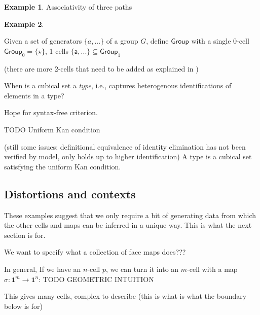 \documentclass[11pt]{article}
\theoremstyle{definition}
\newtheorem{example}{Example}
\newcommand{\pint}[1]{\mathbf{1}^{#1}}
\newcommand{\smap}[1]{s_{{#1}}}
\newcommand{\dmap}[2]{d_{({#1} , {#2})}}
\newcommand{\cset}[1]{\mathsf{{#1}}}
\begin{document}
\begin{example}{\label{exp:assoc}}
  Associativity of three paths
\end{example}

\begin{example}\label{exp:group}

  Given a set of generators $\{a, ...\}$ of a group $G$, define $\cset{Group}$
  with a single 0-cell $\cset{Group}_0 = \{ \cset{\star} \}$, 
  1-cells $\{\cset{a} , ... \} \subseteq \cset{Group}_1$ 
  
  (there are more 2-cells that need to be added as explained in \cite[Sect. 6.3]{bezem14_model_type_theor_cubic_sets})
\end{example}


When is a cubical set a \emph{type}, i.e., captures heterogenous identifications
of elements in a type?

Hope for syntax-free criterion.

TODO Uniform Kan condition


(still some issues: definitional equivalence of identity elimination has not
been verified by model, only holds up to higher identification)
A type is a cubical set satisfying the uniform Kan condition.

\subsection{Distortions and contexts} %

These examples suggest that we only require a bit of generating data from which
the other cells and maps can be inferred in a unique way. This is what the next
section is for.

We want to specify what a collection of face maps does???

In general, 
If we have an $n$-cell $p$, we can turn it into an $m$-cell with a map $\sigma :
\pint{m} \to \pint{n}$: TODO GEOMETRIC INTUITION

This gives many cells, complex to describe (this is what is what the boundary
below is for)
\end{document}
